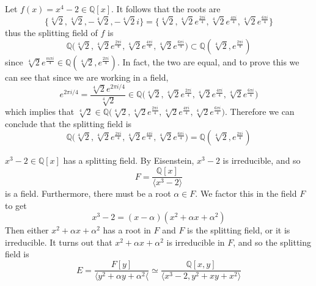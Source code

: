   \begin{example}
    Let $f(x) = x^4 - 2 \in \mathbb{Q}[x]$. It follows that the roots are 
    \begin{equation}
      \{ \sqrt[4]{2}, \sqrt[4]{2}, -\sqrt[4]{2}, - \sqrt[4]{2} i \} = \Big\{ \sqrt[4]{2}, \sqrt[4]{2} e^{\frac{2\pi i}{4}}, \sqrt[4]{2} e^{\frac{4\pi i}{4}}, \sqrt[4]{2} e^{\frac{6\pi i}{4}} \Big\}
    \end{equation}
    thus the splitting field of $f$ is 
    \begin{equation}
      \mathbb{Q} \big( \sqrt[4]{2}, \sqrt[4]{2} e^{\frac{2\pi i}{4}}, \sqrt[4]{2} e^{\frac{4\pi i}{4}}, \sqrt[4]{2} e^{\frac{6\pi i}{4}} \big) \subset \mathbb{Q}(\sqrt[4]{2}, e^{\frac{2\pi i}{4}})
    \end{equation}
    since $\sqrt[4]{2} e^{\frac{m \pi i}{4}} \in \mathbb{Q}(\sqrt[4]{2}, e^{\frac{2\pi i}{4}})$. In fact, the two are equal, and to prove this we can see that since we are working in a field, 
    \begin{equation}
      e^{2 \pi i / 4} = \frac{\sqrt[4]{2} e^{2\pi i/4}}{\sqrt[4]{2}} \in \mathbb{Q} \big( \sqrt[4]{2}, \sqrt[4]{2} e^{\frac{2\pi i}{4}}, \sqrt[4]{2} e^{\frac{4\pi i}{4}}, \sqrt[4]{2} e^{\frac{6\pi i}{4}} \big) 
    \end{equation}
    which implies that $\sqrt[4]{2} \in \mathbb{Q} \big( \sqrt[4]{2}, \sqrt[4]{2} e^{\frac{2\pi i}{4}}, \sqrt[4]{2} e^{\frac{4\pi i}{4}}, \sqrt[4]{2} e^{\frac{6\pi i}{4}} \big)$. Therefore we can conclude that the splitting field is 
    \begin{equation}
      \mathbb{Q} \big( \sqrt[4]{2}, \sqrt[4]{2} e^{\frac{2\pi i}{4}}, \sqrt[4]{2} e^{\frac{4\pi i}{4}}, \sqrt[4]{2} e^{\frac{6\pi i}{4}} \big) = \mathbb{Q}(\sqrt[4]{2}, e^{\frac{2\pi i}{4}})
    \end{equation}
  \end{example} 

  \begin{example}
    $x^3 - 2 \in \mathbb{Q}[x]$ has a splitting field. By Eisenstein, $x^3 - 2$ is irreducible, and so 
    \begin{equation}
      F = \frac{\mathbb{Q}[x]}{\langle x^3 - 2 \rangle} 
    \end{equation}
    is a field. Furthermore, there must be a root $\alpha \in F$. We factor this in the field $F$ to get 
    \begin{equation}
      x^3 - 2 = (x - \alpha) (x^2 + \alpha x + \alpha^2) 
    \end{equation}
    Then either $x^2 + \alpha x + \alpha^2$ has a root in $F$ and $F$ is the splitting field, or it is irreducible. It turns out that $x^2 + \alpha x + \alpha^2$ is irreducible in $F$, and so the splitting field is 
    \begin{equation}
      E = \frac{F[y]}{\langle y^2 + \alpha y + \alpha^2 \langle} \simeq \frac{\mathbb{Q}[x, y]}{\langle x^3 - 2, y^2 + xy + x^2 \rangle}
    \end{equation}
  \end{example}

